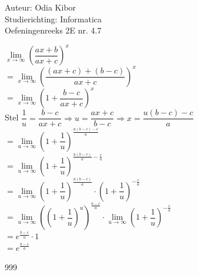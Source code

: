 \documentclass[a4paper]{article}
\begin{document}
  
\noindent \large Auteur: Odia Kibor \\
\noindent \large Studierichting: Informatica\\
\noindent \large Oefeningenreeks 2E nr. 4.7\\

\medskip

\normalsize


$\lim\limits_{x \rightarrow \infty} \left(\dfrac{ax+b}{ax+c}\right)^x$\\

$= \lim\limits_{x \rightarrow \infty} \left(\dfrac{(ax+c)+(b-c)}{ax+c}\right)^x$\\

$= \lim\limits_{x \rightarrow \infty} \left(1+\dfrac{b-c}{ax+c}\right)^x$\\

Stel $\dfrac{1}{u} = \dfrac{b - c}{ax + c} \Rightarrow u = \dfrac{ax + c}{b - c} \Rightarrow x = \dfrac{u(b-c) - c}{a}$\\

$= \lim\limits_{u \rightarrow \infty} \left(1+\dfrac{1}{u}\right)^{\tfrac{u(b-c)-c}{a}}$\\

$= \lim\limits_{u \rightarrow \infty} \left(1+\dfrac{1}{u}\right)^{\tfrac{u(b-c)}{a}-\tfrac{c}{a}}$\\

$= \lim\limits_{u \rightarrow \infty} \left(1+\dfrac{1}{u}\right)^{\tfrac{u(b-c)}{a}}\cdot \left(1+\dfrac{1}{u}\right)^{-\tfrac{c}{a}}$\\

$= \lim\limits_{u \rightarrow \infty} \left
(\left(1+\dfrac{1}{u}\right)^u\right)^{\tfrac{b-c}{a}}\cdot \lim\limits_{u \rightarrow \infty}\left(1+\dfrac{1}{u}\right)^{-\tfrac{c}{a}}$\\

$= e^{\tfrac{b-c}{a}}\cdot 1$\\

$= e^{\tfrac{b-c}{a}}$
















\begin{thebibliography}{999}
\end{thebibliography}
\end{document}
